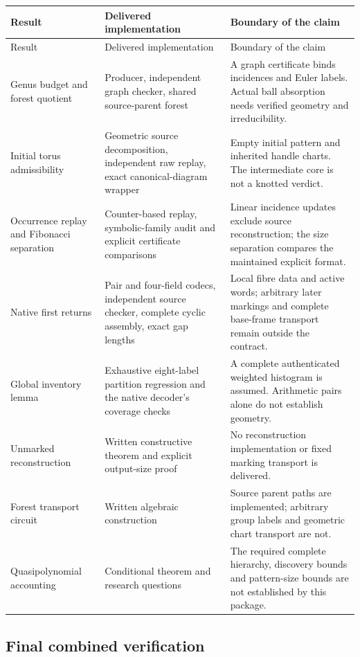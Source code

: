 \begin{longtable}{@{}P{.27\linewidth}P{.31\linewidth}P{.36\linewidth}@{}}
\toprule
Result & Delivered implementation & Boundary of the claim\\
\midrule
\endfirsthead
\toprule
Result & Delivered implementation & Boundary of the claim\\
\midrule
\endhead
Genus budget and forest quotient & Producer, independent graph checker,
shared source-parent forest & A graph certificate binds incidences and Euler
labels.  Actual ball absorption needs verified geometry and irreducibility.\\
Initial torus admissibility & Geometric source decomposition, independent
raw replay, exact canonical-diagram wrapper & Empty initial pattern and
inherited handle charts.  The intermediate core is not a knotted verdict.\\
Occurrence replay and Fibonacci separation & Counter-based replay,
symbolic-family audit and explicit certificate comparisons & Linear
incidence updates exclude source reconstruction; the size separation
compares the maintained explicit format.\\
Native first returns & Pair and four-field codecs, independent source
checker, complete cyclic assembly, exact gap lengths & Local fibre data
and active words; arbitrary later markings and complete base-frame
transport remain outside the contract.\\
Global inventory lemma & Exhaustive eight-label partition regression and
the native decoder's coverage checks & A complete authenticated weighted
histogram is assumed.  Arithmetic pairs alone do not establish geometry.\\
Unmarked reconstruction & Written constructive theorem and explicit
output-size proof & No reconstruction implementation or fixed marking
transport is delivered.\\
Forest transport circuit & Written algebraic construction & Source
parent paths are implemented; arbitrary group labels and geometric chart
transport are not.\\
Quasipolynomial accounting & Conditional theorem and research questions &
The required complete hierarchy, discovery bounds and pattern-size bounds
are not established by this package.\\
\bottomrule
\end{longtable}

\subsection{Final combined verification}

